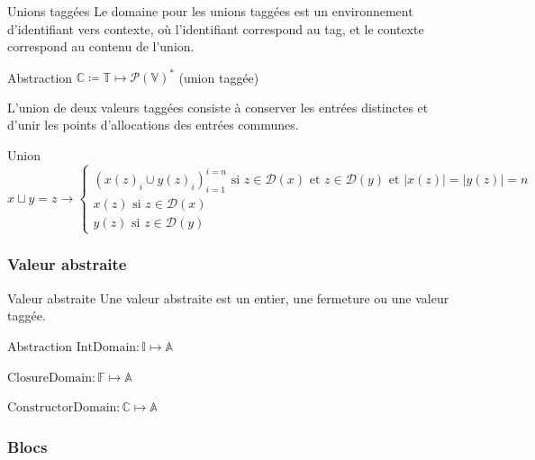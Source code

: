 \documentclass{beamer}
\begin{document}
\begin{frame}{Unions taggées}
    Le domaine pour les unions taggées est un environnement d'identifiant vers contexte, où l'identifiant correspond au tag, et le contexte correspond au contenu de l'union.

    \begin{block}{Abstraction}
        $\mathbb{C} \coloneqq \mathbb{T} \mapsto \mathcal{P}(\mathbb{V})^{*}$ (union taggée)
    \end{block}

    L'union de deux valeurs taggées consiste à conserver les entrées distinctes et d'unir les points d'allocations des entrées communes.%
    
    \begin{block}{Union}
        $$
        x \sqcup y = z \rightarrow
        \begin{cases}
            \left( x(z)_i \cup y(z)_i \right)_{i=1}^{i=n} \text{ si } z \in \mathcal{D}(x) \text{ et } z \in \mathcal{D}(y) \text{ et } |x(z)| = |y(z)| = n \\
            x(z) \text{ si } z \in \mathcal{D}(x) \\
            y(z) \text{ si } z \in \mathcal{D}(y)
        \end{cases}
        $$
    \end{block}
\end{frame}



\subsubsection{Valeur abstraite}

\begin{frame}{Valeur abstraite}
    Une valeur abstraite est un entier, une fermeture ou une valeur taggée.

    \begin{block}{Abstraction}
        $\text{IntDomain} : \mathbb{I} \mapsto \mathbb{A}$

        $\text{ClosureDomain} : \mathbb{F} \mapsto \mathbb{A}$

        $\text{ConstructorDomain} : \mathbb{C} \mapsto \mathbb{A}$
    \end{block}
\end{frame}

\subsubsection{Blocs}
\end{document}
